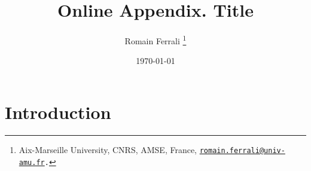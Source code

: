 \documentclass[11pt]{article}
\title{
    Online Appendix. Title
}
\author{
    Romain Ferrali
    \thanks{
        Aix-Marseille University, CNRS, AMSE, France, {\tt \href{mailto:romain.ferrali@univ-amu.fr}{romain.ferrali@univ-amu.fr}.}
    }
}
\date{\today}
\theoremstyle{definition}
\theoremstyle{remark}
\begin{document}
\sloppy %

\if{}
    \maketitle
\fi

\newpage
\tableofcontents
\listoffigures
\listoftables
\newpage

\section{Introduction}

\newpage
%  
% 
\end{document}
